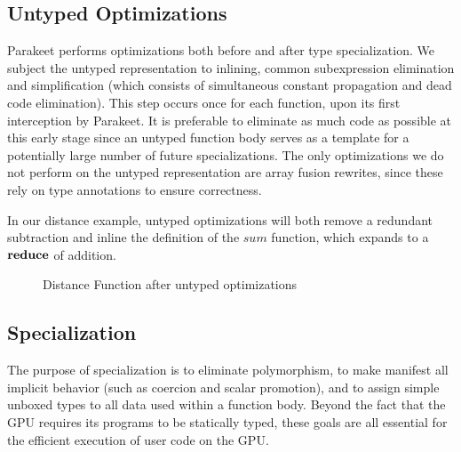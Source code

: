 \documentclass[preprint]{sigplanconf}
\begin{document}
\subsection{Untyped Optimizations}
Parakeet performs optimizations both before and after type specialization. We
subject the untyped representation to inlining, common subexpression elimination
and simplification (which consists of simultaneous constant propagation and dead
code elimination). This step occurs once for each function, upon its first
interception by Parakeet. It is preferable to eliminate as much code as possible
at this early stage since an untyped function body serves as a template for a
potentially large number of future specializations. The only optimizations we do
not perform on the untyped representation are array fusion rewrites, since these
rely on type annotations to ensure correctness.

In our distance example, untyped optimizations will both remove a redundant
subtraction and inline the definition of the $sum$ function, which expands to a
$\mbox{\textbf{reduce}}$ of addition.
\begin{figure}[h!]
\caption{Distance Function after untyped optimizations}
\end{figure}

\subsection{Specialization}
The purpose of specialization is to eliminate polymorphism, to make manifest
all implicit behavior (such as coercion and scalar promotion), and to assign
simple unboxed types to all data used within a function body. Beyond the
fact that the GPU requires its programs to be statically typed, these goals are
all essential for the efficient execution of user code on the GPU.
\end{document}
